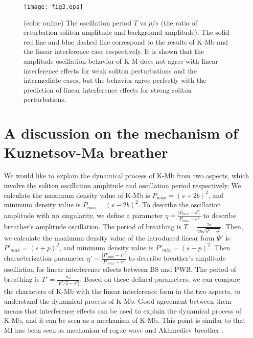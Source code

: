 \documentclass[aps,twocolumn,showpacs]{revtex4}
\begin{document}
 \begin{figure}[htb]
\centering
\label{fig:3}
{\texttt{[image: fig3.eps]}}
\caption{(color online) The oscillation period $T$ vs $p/s$ (the ratio of erturbation soliton amplitude and background amplitude). The solid red line and blue dashed line correspond to the results of K-Mb and the linear interference case respectively. It is shown that the amplitude oscillation behavior of K-M does not agree with linear interference effects for weak soliton perturbations and the  intermediate cases, but the behavior agree perfectly with the prediction of linear interference effects for strong soliton perturbations. }
\end{figure}

\section{A discussion on the mechanism of  Kuznetsov-Ma  breather}
We would like to explain the dynamical process of K-Mb from two aspects, which involve the soliton oscillation amplitude and oscillation period respectively. We calculate the maximum density value of K-Mb is $P_{max}=(s+2b)^2$, and minimum density value is $P_{min}=(s-2b)^2$. To describe the oscillation amplitude with no singularity, we define a parameter $\eta=\frac{|P_{min}-s^2|} {P_{max}-s^2}$ to describe breather's amplitude oscillation. The period of breathing is $T=\frac{2 \pi} {2 b \sqrt{b^2-s^2}}$. Then, we calculate the maximum density value of the introduced linear form $\Psi'$ is $P'_{max}=(s+p)^2$, and minimum density value is $P'_{min}=(s-p)^2$. Then characterization parameter $\eta'=\frac{|P'_{min}-s^2|} {P'_{max}-s^2}$ to describe breather's amplitude oscillation for linear interference effects between BS and PWB. The period of breathing is $T'=\frac{2 \pi} {| p^2/2-s^2|}$. Based on these defined parameters, we can compare the characters of K-Mb with the linear interference form in the two aspects, to understand the dynamical process of K-Mb. Good agreement between them means that interference effects can be used to explain the dynamical process of K-Mb, and it can be seen as a mechanism of K-Mb. This point is similar to that MI has been seen as mechanism of rogue wave and Akhmediev breather \cite{Dudley,zhaoling,Lingzhao}.
\end{document}
